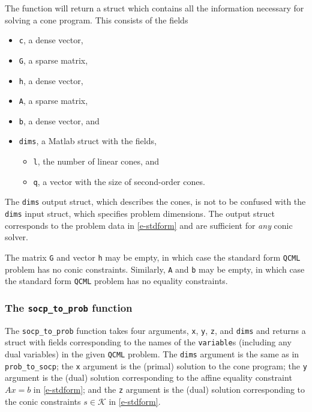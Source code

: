 \documentclass[11pt]{article}
\def\qcml{\texttt{QCML}\xspace}
\begin{document}
The function will return a struct which contains all the information
necessary for solving a cone program. This consists of the fields
\begin{itemize}
  \item {\tt c}, a dense vector,
  \item {\tt G}, a sparse matrix,
  \item {\tt h}, a dense vector,
  \item {\tt A}, a sparse matrix,
  \item {\tt b}, a dense vector, and
  \item {\tt dims}, a Matlab struct with the fields,
  \begin{itemize}
    \item {\tt l}, the number of linear cones, and
    \item {\tt q}, a vector with the size of second-order cones.
  \end{itemize}
\end{itemize}
The {\tt dims} output struct, which describes the cones,
is not to be confused with the {\tt dims} input
struct, which specifies problem dimensions.
The output struct corresponds to the problem data in \eqref{e-stdform}
and are sufficient for \emph{any} conic solver.

The matrix {\tt G} and vector {\tt h} may be empty, in which case the
standard form \qcml problem has no conic constraints. Similarly, {\tt A} and
{\tt b} may be empty, in which case the standard form \qcml problem has no
equality constraints.

\subsubsection{The {\tt socp\_to\_prob} function}
The {\tt socp\_to\_prob} function takes four arguments, {\tt x}, {\tt y},
{\tt z}, and {\tt dims} and returns a struct with fields
corresponding to the names of the {\tt variable}s (including any dual
variables) in the given \qcml problem.
The {\tt dims} argument is the same as in {\tt prob\_to\_socp}; the {\tt x}
argument is the (primal) solution to the cone program; the {\tt y}
argument is the (dual) solution corresponding to the
affine equality constraint $Ax=b$ in \eqref{e-stdform}; and the {\tt z}
argument is the (dual) solution corresponding
to the conic constraints $s \in \mathcal{K}$ in \eqref{e-stdform}.
\end{document}
